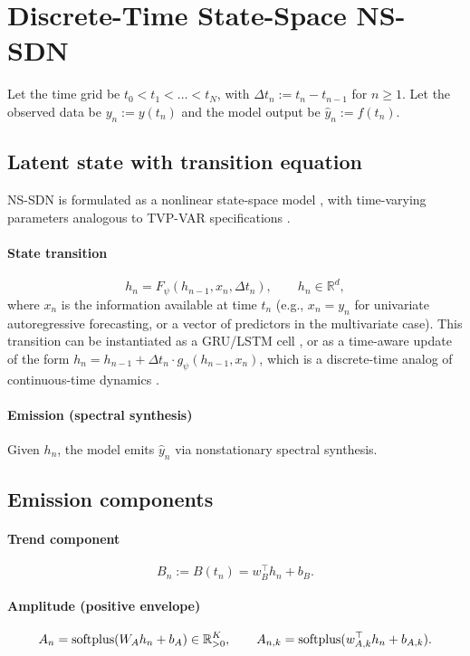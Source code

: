 \section{Discrete-Time State-Space NS-SDN}
Let the time grid be $t_0 < t_1 < \dots < t_N$, with $\Delta t_n := t_n - t_{n-1}$ for $n \ge 1$. Let the observed data be $y_n := y(t_n)$ and the model output be $\hat y_n := f(t_n)$.

\subsection{Latent state with transition equation}
NS-SDN is formulated as a nonlinear state-space model \citep{durbin2012}, with time-varying parameters analogous to TVP-VAR specifications \citep{lubik2015}.

\paragraph{State transition}
\begin{equation}
h_n = F_\psi(h_{n-1}, x_n, \Delta t_n), \qquad h_n \in \mathbb{R}^d,
\label{eq:transition}
\end{equation}
where $x_n$ is the information available at time $t_n$ (e.g., $x_n = y_n$ for univariate autoregressive forecasting, or a vector of predictors in the multivariate case). This transition can be instantiated as a GRU/LSTM cell \citep{cho2014,hochreiter1997}, or as a time-aware update of the form $h_n = h_{n-1} + \Delta t_n \cdot g_\psi(h_{n-1}, x_n)$, which is a discrete-time analog of continuous-time dynamics \citep{chen2018}.

\paragraph{Emission (spectral synthesis)}
Given $h_n$, the model emits $\hat y_n$ via nonstationary spectral synthesis.

\subsection{Emission components}
\paragraph{Trend component}
\begin{equation}
B_n := B(t_n) = w_B^\top h_n + b_B.
\end{equation}

\paragraph{Amplitude (positive envelope)}
\begin{equation}
A_n = \operatorname{softplus}(W_A h_n + b_A) \in \mathbb{R}_{>0}^{K},
\qquad
A_{n,k} = \operatorname{softplus}(w_{A,k}^\top h_n + b_{A,k}).
\end{equation}


